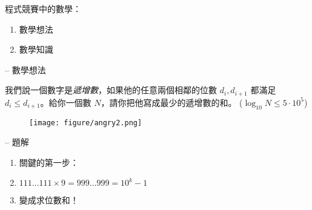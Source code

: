 \documentclass[standalone]{beamer}
\begin{document}
\begin{frame}{}
  程式競賽中的數學：
  \begin{enumerate}
    \setlength{\itemindent}{2em}
    \item 數學想法
    \item 數學知識
  \end{enumerate}
\end{frame}

\begin{frame}{{\secname} -- 數學想法}
  \begin{problem}
    我們說一個數字是\emph{遞增數}，如果他的任意兩個相鄰的位數 $d_i, d_{i+1}$
    都滿足 $d_i \leq d_{i+1}$。給你一個數 $N$，請你把他寫成最少的遞增數的和。
    ($\log_{10} N \leq 5 \cdot 10^5$)
  \end{problem} 
  \pause \disskip
  \begin{figure}
    \texttt{[image: figure/angry2.png]}
  \end{figure}
\end{frame}

\begin{frame}{{\secname} -- 題解}
  \begin{enumerate}[<+->]
    \item 關鍵的第一步：
    \item $111\dots111 \times 9 = 999\dots999 = 10^k - 1$
    \item 變成求位數和！
  \end{enumerate}
\end{frame}
\end{document}
